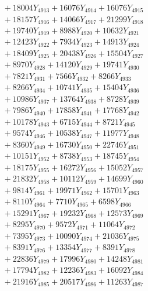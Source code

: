 \documentclass[a4paper,10pt]{article}
\begin{document}
{\begin{align}
&\;  + 18004 Y_{4913} + 16076 Y_{4914} + 16076 Y_{4915} \\[0.3ex]
&\;  + 18157 Y_{4916} + 14066 Y_{4917} + 21299 Y_{4918} \\[0.5ex]\allowbreak
&\;  + 19740 Y_{4919} + 8988 Y_{4920} + 10632 Y_{4921} \\[0.3ex]
&\;  + 12423 Y_{4922} + 7934 Y_{4923} + 14913 Y_{4924} \\[0.3ex]
&\;  + 18409 Y_{4925} + 20438 Y_{4926} + 15504 Y_{4927} \\[0.3ex]
&\;  + 8970 Y_{4928} + 14120 Y_{4929} + 19741 Y_{4930} \\[0.3ex]
&\;  + 7821 Y_{4931} + 7566 Y_{4932} + 8266 Y_{4933} \\[0.3ex]
&\;  + 8266 Y_{4934} + 10741 Y_{4935} + 15404 Y_{4936} \\[0.3ex]
&\;  + 10986 Y_{4937} + 13764 Y_{4938} + 8728 Y_{4939} \\[0.3ex]
&\;  + 7986 Y_{4940} + 17858 Y_{4941} + 17768 Y_{4942} \\[0.3ex]
&\;  + 10178 Y_{4943} + 6715 Y_{4944} + 8721 Y_{4945} \\[0.3ex]
&\;  + 9574 Y_{4946} + 10538 Y_{4947} + 11977 Y_{4948} \\[0.5ex]\allowbreak
&\;  + 8360 Y_{4949} + 16730 Y_{4950} + 22746 Y_{4951} \\[0.3ex]
&\;  + 10151 Y_{4952} + 8738 Y_{4953} + 18745 Y_{4954} \\[0.3ex]
&\;  + 18175 Y_{4955} + 16272 Y_{4956} + 15052 Y_{4957} \\[0.3ex]
&\;  + 21832 Y_{4958} + 10112 Y_{4959} + 14699 Y_{4960} \\[0.3ex]
&\;  + 9814 Y_{4961} + 19971 Y_{4962} + 15701 Y_{4963} \\[0.3ex]
&\;  + 8110 Y_{4964} + 7710 Y_{4965} + 6598 Y_{4966} \\[0.3ex]
&\;  + 15291 Y_{4967} + 19232 Y_{4968} + 12573 Y_{4969} \\[0.3ex]
&\;  + 8295 Y_{4970} + 9572 Y_{4971} + 11064 Y_{4972} \\[0.3ex]
&\;  + 7395 Y_{4973} + 10090 Y_{4974} + 21036 Y_{4975} \\[0.3ex]
&\;  + 8391 Y_{4976} + 13354 Y_{4977} + 8391 Y_{4978} \\[0.5ex]\allowbreak
&\;  + 22836 Y_{4979} + 17996 Y_{4980} + 14248 Y_{4981} \\[0.3ex]
&\;  + 17794 Y_{4982} + 12236 Y_{4983} + 16092 Y_{4984} \\[0.3ex]
&\;  + 21916 Y_{4985} + 20517 Y_{4986} + 11263 Y_{4987} \\[0.3ex]

\end{align}}
\end{document}
